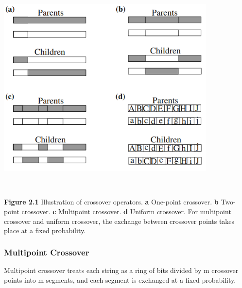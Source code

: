 \documentclass[14pt]{article}
\numberwithin{equation}{subsection}
\begin{document}
		\begin{center}
				\includegraphics[width=11cm, height=11cm]{cross-over_figure2_1.PNG}
		\end{center}
		
		\noindent \textbf{Figure 2.1} Illustration of crossover operators. \textbf{a} One-point crossover. 
		\textbf{b} Two-point 		crossover. \textbf{c}	Multipoint crossover. \textbf{d} Uniform crossover. For
		multipoint crossover and uniform crossover, the exchange	between crossover	points takes place at a fixed
		probability.
		
			\subsubsection{Multipoint Crossover}Multipoint crossover treats each string as a ring of bits divided by m
			crossover points into m segments, and each segment is exchanged at a fixed probability.
			
\end{document}

